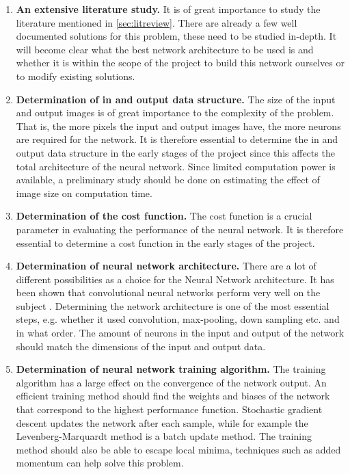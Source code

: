 \begin{enumerate}
\item	\textbf{An extensive literature study.}
It is of great importance to study the literature mentioned in \ref{sec:litreview}. There are already a few well documented solutions for this problem, these need to be studied in-depth. It will become clear what the best network architecture to be used is and whether it is within the scope of the project to build this network ourselves or to modify existing solutions.

\item \textbf{Determination of in and output data structure.}
The size of the input and output images is of great importance to the complexity of the problem. That is, the more pixels the input and output images have, the more neurons are required for the network. It is therefore essential to determine the in and output data structure in the early stages of the project since this affects the total architecture of the neural network. Since limited computation power is available, a preliminary study should be done on estimating the effect of image size on computation time. 

\item \textbf{Determination of the cost function.}
The cost function is a crucial parameter in evaluating the performance of the neural network. It is therefore essential to determine a cost function in the early stages of the project.

\item \textbf{Determination of neural network architecture.}
There are a lot of different possibilities as a choice for the Neural Network architecture. It has been shown that convolutional neural networks perform very well on the subject \cite{Dahl}. Determining the network architecture is one of the most essential steps, e.g. whether it used convolution, max-pooling, down sampling etc. and in what order. The amount of neurons in the input and output of the network should match the dimensions of the input and output data. 

\item \textbf{Determination of neural network training algorithm.}
The training algorithm has a large effect on the convergence of the network output. An efficient training method should find the  weights and biases of the network that correspond to the highest performance function. Stochastic gradient descent updates the network after each sample, while for example the Levenberg-Marquardt method is a batch update method\cite{Hagan}. The training method should also be able to escape local minima, techniques such as added momentum can help solve this problem.


\end{enumerate}
